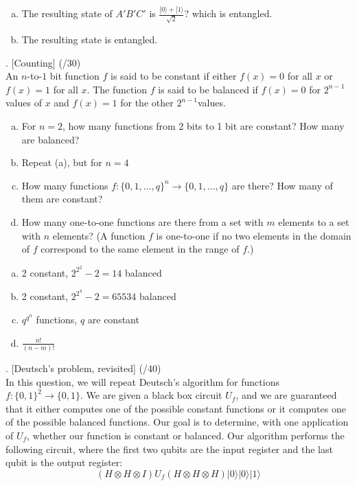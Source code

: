 \documentclass[11pt]{article}
\newenvironment{solution}{\begin{mdframed}[skipabove=\baselineskip,innertopmargin=\baselineskip,innerbottommargin=\baselineskip]
  }{\end{mdframed}}
\begin{document}
\begin{solution}
\begin{enumerate}[(a)]
    \item The resulting state of $A'B'C'$ is $\frac{|0\rangle+|1\rangle}{\sqrt{2}}$? which is entangled.
    \item The resulting state is entangled.
\end{enumerate}
\end{solution}

\vspace{3em}

. [Counting] (/30)
\\
An $n$-to-$1$ bit function $f$ is said to be constant if either $f(x) = 0$ for all $x$ or $f(x) = 1$ for all $x$. The function $f$ is said to be balanced if $f(x) = 0$ for $2^{n-1}$ values of $x$ and $f(x) = 1$ for the other $2^{n-1}$values.

\begin{enumerate}[(a)]
\item For $n = 2$, how many functions from 2 bits to 1 bit are constant? How many are balanced?
\item Repeat (a), but for $n = 4$
\item How many functions $f : \{0,1,...,q\}^n \rightarrow \{0,1,...,q\}$ are there? How many of them are constant?
\item How many one-to-one functions are there from a set with $m$ elements to a set with $n$ elements? (A function $f$ is one-to-one if no two elements in the domain of $f$ correspond to the same element in the range of $f$.)
\end{enumerate}

\begin{solution}
\begin{enumerate}[(a)]
    \item 2 constant, $2^{2^2}-2 = 14$ balanced
    \item 2 constant, $2^{2^4}-2 = 65534$ balanced
    \item $q^{q^n}$ functions, $q$ are constant
    \item $\frac{n!}{(n-m)!}$
\end{enumerate}
\end{solution}

\vspace{3em}

. [Deutsch's problem, revisited] (/40)
\\
In this question, we will repeat Deutsch's algorithm for functions $f : \{0,1\}^2 \rightarrow \{0,1\}$. We are given a black box circuit $U_f$, and we are guaranteed that it either computes one of the possible constant functions or it computes one of the possible balanced functions. Our goal is to determine, with one application of $U_f$, whether our function is constant or balanced. Our algorithm performs the following circuit, where the first two qubits are the input register and the last qubit is the output register:
$$(H\otimes H\otimes I)U_f(H\otimes H\otimes H)|0\rangle|0\rangle|1\rangle$$
\end{document}

